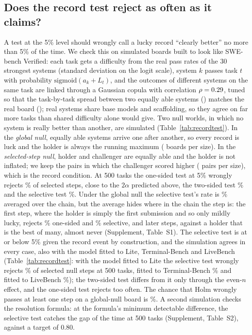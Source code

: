 \documentclass[11pt]{article}
\begin{document}
\subsection{Does the record test reject as often as it claims?}
A test at the 5\% level should wrongly call a lucky record ``clearly better'' no more than 5\% of the time.
We check this on simulated boards built to look like SWE-bench Verified: each task gets a difficulty from the real pass rates of the 30 strongest systems (standard deviation \NumSimSdLogit{} on the logit scale), system $k$ passes task $t$ with probability $\mathrm{sigmoid}(a_k+L_t)$, and the outcomes of different systems on the same task are linked through a Gaussian copula with correlation $\rho=0.29$, tuned so that the task-by-task spread between two equally able systems (\NumSimSdSim) matches the real board (\NumSimSdReal); real systems share base models and scaffolding, so they agree on far more tasks than shared difficulty alone would give.
Two null worlds, in which no system is really better than another, are simulated (Table~\ref{tab:recordtest}).
In the \emph{global null}, \NumSimK{} equally able systems arrive one after another, so every record is luck and the holder is always the running maximum (\NumNullR{} boards per size).
In the \emph{selected-step null}, holder and challenger are equally able and the holder is not inflated; we keep the pairs in which the challenger scored higher (\NumNullSelPairs{} pairs per size), which is the record condition.
At 500 tasks the one-sided test at 5\% wrongly rejects \NumNullSelOneB\% of selected steps, close to the $2\alpha$ predicted above, the two-sided test \NumNullSelTwoB\% and the selective test \NumNullSelSelB\%.
Under the global null the selective test's rate is \NumNullSelectiveB\% averaged over the chain, but the average hides where in the chain the step is: the first step, where the holder is simply the first submission and so only mildly lucky, rejects \NumNullPosFirstOneB\% one-sided and \NumNullPosFirstSelB\% selective, and later steps, against a holder that is the best of many, almost never (Supplement, Table~S1).
The selective test is at or below 5\% given the record event by construction, and the simulation agrees in every case, also with the model fitted to Lite, Terminal-Bench and LiveBench (Table~\ref{tab:recordtest}: with the model fitted to Lite the selective test wrongly rejects \NumRtestSelSelLite\% of selected null steps at 500 tasks, fitted to Terminal-Bench \NumRtestSelSelTB\% and fitted to LiveBench \NumRtestSelSelLB\%); the two-sided test differs from it only through the even-$n$ effect, and the one-sided test rejects too often.
The chance that Holm wrongly passes at least one step on a global-null board is \NumNullHolmB\%.
A second simulation checks the resolution formula: at the formula's minimum detectable difference, the selective test catches the gap \NumPowerAtMddSelB{} of the time at 500 tasks (Supplement, Table~S2), against a target of 0.80.
\end{document}
